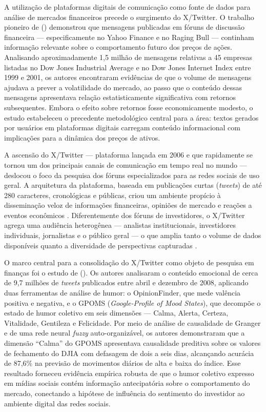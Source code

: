 A utilização de plataformas digitais de comunicação como fonte de dados para análise de mercados financeiros precede o surgimento do X/Twitter. O trabalho pioneiro de \citeauthor{antweiler2004} (\citeyear{antweiler2004}) demonstrou que mensagens publicadas em fóruns de discussão financeira --- especificamente no Yahoo Finance e no Raging Bull --- continham informação relevante sobre o comportamento futuro dos preços de ações. Analisando aproximadamente 1,5 milhão de mensagens relativas a 45 empresas listadas no Dow Jones Industrial Average e no Dow Jones Internet Index entre 1999 e 2001, os autores encontraram evidências de que o volume de mensagens ajudava a prever a volatilidade do mercado, ao passo que o conteúdo dessas mensagens apresentava relação estatisticamente significativa com retornos subsequentes. Embora o efeito sobre retornos fosse economicamente modesto, o estudo estabeleceu o precedente metodológico central para a área: textos gerados por usuários em plataformas digitais carregam conteúdo informacional com implicações para a dinâmica dos preços de ativos.

A ascensão do X/Twitter --- plataforma lançada em 2006 e que rapidamente se tornou um dos principais canais de comunicação em tempo real no mundo --- deslocou o foco da pesquisa dos fóruns especializados para as redes sociais de uso geral. A arquitetura da plataforma, baseada em publicações curtas (\textit{tweets}) de até 280 caracteres, cronológicas e públicas, criou um ambiente propício à disseminação veloz de informações financeiras, opiniões de mercado e reações a eventos econômicos \cite{sprenger2014}. Diferentemente dos fóruns de investidores, o X/Twitter agrega uma audiência heterogênea --- analistas institucionais, investidores individuais, jornalistas e o público geral --- o que amplia tanto o volume de dados disponíveis quanto a diversidade de perspectivas capturadas \cite{mao2011}.

O marco central para a consolidação do X/Twitter como objeto de pesquisa em finanças foi o estudo de \citeauthor{bollen2011} (\citeyear{bollen2011}). Os autores analisaram o conteúdo emocional de cerca de 9,7 milhões de \textit{tweets} publicados entre abril e dezembro de 2008, aplicando duas ferramentas de análise de humor: o OpinionFinder, que mede valência positiva e negativa, e o GPOMS (\textit{Google-Profile of Mood States}), que decompõe o estado de humor coletivo em seis dimensões --- Calma, Alerta, Certeza, Vitalidade, Gentileza e Felicidade. Por meio de análise de causalidade de Granger e de uma rede neural \textit{fuzzy} auto-organizável, os autores demonstraram que a dimensão ``Calma'' do GPOMS apresentava causalidade preditiva sobre os valores de fechamento do DJIA com defasagem de dois a seis dias, alcançando acurácia de 87,6\% na previsão de movimentos diários de alta e baixa do índice. Esse resultado forneceu evidência empírica robusta de que o humor coletivo expresso em mídias sociais contém informação antecipatória sobre o comportamento do mercado, conectando a hipótese de influência do sentimento do investidor \cite{baker2007} ao ambiente digital das redes sociais.

